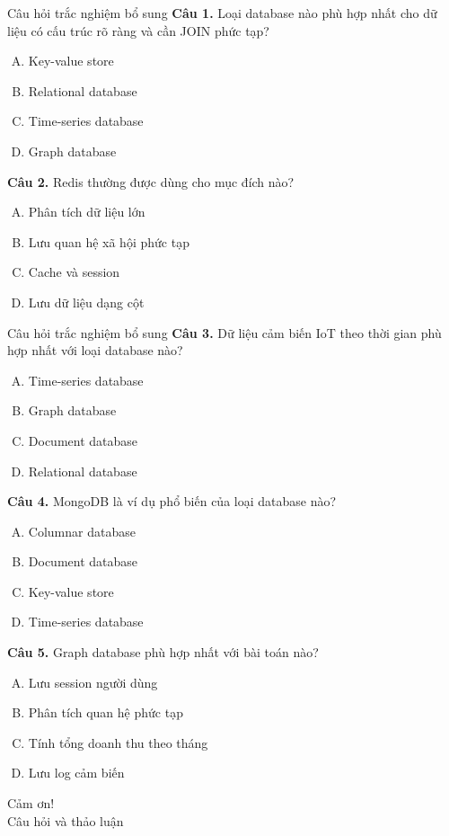 \documentclass[aspectratio=169,11pt]{beamer}
\begin{document}
\begin{frame}{Câu hỏi trắc nghiệm bổ sung}
\small
\textbf{Câu 1.} Loại database nào phù hợp nhất cho dữ liệu có cấu trúc rõ ràng và cần JOIN phức tạp?
\begin{enumerate}[A.]
  \item Key-value store
  \item Relational database
  \item Time-series database
  \item Graph database
\end{enumerate}

\textbf{Câu 2.} Redis thường được dùng cho mục đích nào?
\begin{enumerate}[A.]
  \item Phân tích dữ liệu lớn
  \item Lưu quan hệ xã hội phức tạp
  \item Cache và session
  \item Lưu dữ liệu dạng cột
\end{enumerate}
\end{frame}

\begin{frame}{Câu hỏi trắc nghiệm bổ sung}
\small
\textbf{Câu 3.} Dữ liệu cảm biến IoT theo thời gian phù hợp nhất với loại database nào?
\begin{enumerate}[A.]
  \item Time-series database
  \item Graph database
  \item Document database
  \item Relational database
\end{enumerate}

\textbf{Câu 4.} MongoDB là ví dụ phổ biến của loại database nào?
\begin{enumerate}[A.]
  \item Columnar database
  \item Document database
  \item Key-value store
  \item Time-series database
\end{enumerate}

\textbf{Câu 5.} Graph database phù hợp nhất với bài toán nào?
\begin{enumerate}[A.]
  \item Lưu session người dùng
  \item Phân tích quan hệ phức tạp
  \item Tính tổng doanh thu theo tháng
  \item Lưu log cảm biến
\end{enumerate}
\end{frame}

\begin{frame}
\centering
\Huge Cảm ơn!\\
\vspace{4mm}
\Large Câu hỏi và thảo luận
\end{frame}
\end{document}
